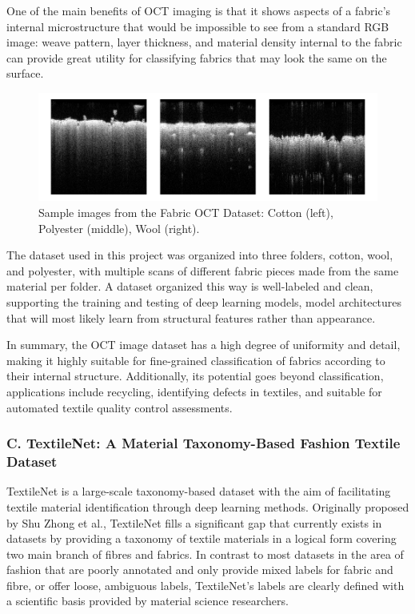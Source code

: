 One of the main benefits of OCT imaging is that it shows aspects of a fabric’s internal microstructure that would be impossible to see from a standard RGB image: weave pattern, layer thickness, and material density internal to the fabric can provide great utility for classifying fabrics that may look the same on the surface. 

\begin{figure}[H]
    \centering
    \begin{minipage}{0.8\linewidth}
        \includegraphics[width=\linewidth]{images/FabricOCTDataset.png}
    \end{minipage}
    \caption[Sample images from the Fabric OCT Dataset]{Sample images from the Fabric OCT Dataset: Cotton (left), Polyester (middle), Wool (right).}
\end{figure}

The dataset used in this project was organized into three folders, cotton, wool, and polyester, with multiple scans of different fabric pieces made from the same material per folder. A dataset organized this way is well-labeled and clean, supporting the training and testing of deep learning models, model architectures that will most likely learn from structural features rather than appearance. 

In summary, the OCT image dataset has a high degree of uniformity and detail, making it highly suitable for fine-grained classification of fabrics according to their internal structure. Additionally, its potential goes beyond classification, applications include recycling, identifying defects in textiles, and suitable for automated textile quality control assessments.

\subsubsection{C. TextileNet: A Material Taxonomy-Based Fashion Textile Dataset~\cite{zhong2023textilenet}}

TextileNet is a large-scale taxonomy-based dataset with the aim of facilitating textile material identification through deep learning methods. Originally proposed by Shu Zhong et al., TextileNet fills a significant gap that currently exists in datasets by providing a taxonomy of textile materials in a logical form covering two main branch of fibres and fabrics. In contrast to most datasets in the area of fashion that are poorly annotated and only provide mixed labels for fabric and fibre, or offer loose, ambiguous labels, TextileNet's labels are clearly defined with a scientific basis provided by material science researchers.

